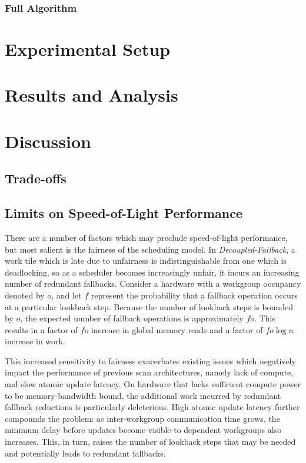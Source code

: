 \documentclass[sigconf]{acmart}
\begin{document}
\subsubsection{Full Algorithm}

\section{Experimental Setup}

\section{Results and Analysis}

\section{Discussion}

\subsection{Trade-offs}

\subsection{Limits on Speed-of-Light Performance}
There are a number of factors which may preclude speed-of-light performance, but most salient is the fairness of the scheduling model. In \emph{Decoupled-Fallback}, a work tile which is late due to unfairness is indistinguishable from one which is deadlocking, so as a scheduler becomes increasingly unfair, it incurs an increasing number of redundant fallbacks. Consider a hardware with a workgroup occupancy denoted by $o$, and let $f$ represent the probability that a fallback operation occurs at a particular lookback step. Because the number of lookback steps is bounded by $o$, the expected number of fallback operations is approximately $fo$. This results in a factor of $fo$ increase in global memory reads and a factor of $fo\log{n}$ increase in work.

This increased sensitivity to fairness exacerbates existing issues which negatively impact the performance of previous scan architectures, namely lack of compute, and slow atomic update latency. On hardware that lacks sufficient compute power to be memory-bandwidth bound, the additional work incurred by redundant fallback reductions is particularly deleterious. High atomic update latency further compounds the problem: as inter-workgroup communication time grows, the minimum delay before updates become visible to dependent workgroups also increases. This, in turn, raises the number of lookback steps that may be needed and potentially leads to redundant fallbacks.
\end{document}
